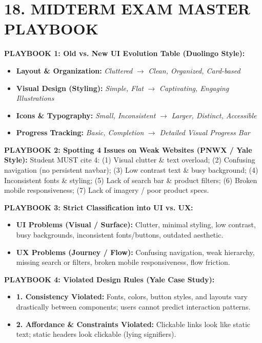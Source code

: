 \documentclass[8.5pt,a4paper,twocolumn]{article}
\begin{document}
\section*{18. MIDTERM EXAM MASTER PLAYBOOK}

\begin{miniplaybook}
\scriptsize
\textbf{PLAYBOOK 1: Old vs. New UI Evolution Table (Duolingo Style):}
\begin{itemize}[leftmargin=8pt, itemsep=0.5pt]
    \item \textbf{Layout \& Organization:} \textit{Cluttered} $\longrightarrow$ \textit{Clean, Organized, Card-based}
    \item \textbf{Visual Design (Styling):} \textit{Simple, Flat} $\longrightarrow$ \textit{Captivating, Engaging Illustrations}
    \item \textbf{Icons \& Typography:} \textit{Small, Inconsistent} $\longrightarrow$ \textit{Larger, Distinct, Accessible}
    \item \textbf{Progress Tracking:} \textit{Basic, Completion} $\longrightarrow$ \textit{Detailed Visual Progress Bar}
\end{itemize}

\vspace{1pt}
\textbf{PLAYBOOK 2: Spotting 4 Issues on Weak Websites (PNWX / Yale Style):}
Student MUST cite 4: (1) Visual clutter \& text overload; (2) Confusing navigation (no persistent navbar); (3) Low contrast text \& busy background; (4) Inconsistent fonts \& styling; (5) Lack of search bar \& product filters; (6) Broken mobile responsiveness; (7) Lack of imagery / poor product specs.

\vspace{1pt}
\textbf{PLAYBOOK 3: Strict Classification into UI vs. UX:}
\begin{itemize}[leftmargin=8pt, itemsep=0.5pt]
    \item \textbf{UI Problems (Visual / Surface):} Clutter, minimal styling, low contrast, busy backgrounds, inconsistent fonts/buttons, outdated aesthetic.
    \item \textbf{UX Problems (Journey / Flow):} Confusing navigation, weak hierarchy, missing search or filters, broken mobile responsiveness, flow friction.
\end{itemize}

\vspace{1pt}
\textbf{PLAYBOOK 4: Violated Design Rules (Yale Case Study):}
\begin{itemize}[leftmargin=8pt, itemsep=0.5pt]
    \item \textbf{1. Consistency Violated:} Fonts, colors, button styles, and layouts vary drastically between components; users cannot predict interaction patterns.
    \item \textbf{2. Affordance \& Constraints Violated:} Clickable links look like static text; static headers look clickable (lying signifiers).
\end{itemize}


\end{miniplaybook}
\end{document}
